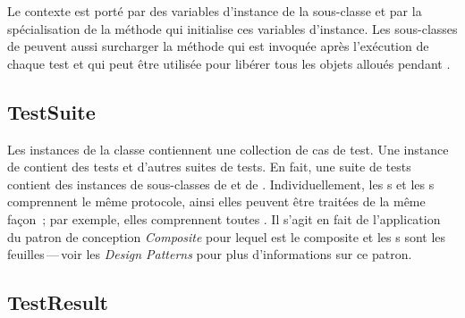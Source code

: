 \documentclass[a4paper,10pt,twoside]{book}
\begin{document}
Le contexte est porté par des variables d'instance de la sous-classe et par la spécialisation de la méthode  qui initialise ces variables d'instance.  Les sous-classes de  peuvent aussi surcharger la méthode  qui est invoquée après l'exécution de chaque test et qui peut être utilisée pour libérer tous les objets alloués pendant .
\subsection{TestSuite}

Les instances de la classe  contiennent une collection de cas de test. Une instance de  contient des tests et d'autres suites de tests. En fait, une suite de tests contient des instances de sous-classes de  et de .
Individuellement, les s et les s comprennent le même protocole, ainsi elles peuvent être traitées de la même façon~; par exemple, elles comprennent toutes .
Il s'agit en fait de l'application du patron de conception 
\emph{Composite}
pour lequel  est le composite et les s sont les feuilles\,---\,voir les \textit{Design Patterns} pour plus d'informations sur ce patron\cite{Gamm95a}.
\subsection{TestResult}
\end{document}
